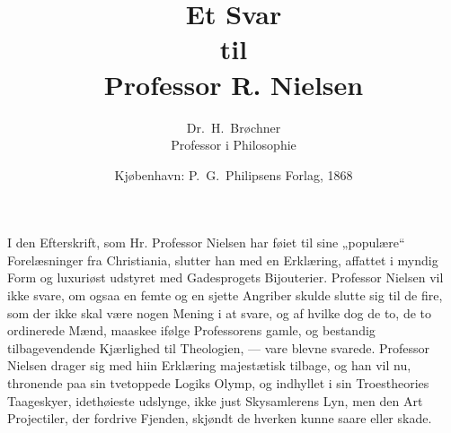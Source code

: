 \documentclass[12pt,a4paper]{book}
\title{\textbf{Et Svar\\[2pt] til\\[2pt] Professor R. Nielsen}}
\author{Dr.\ H.\ Brøchner\\[4pt]
  \small Professor i Philosophie}
\date{Kjøbenhavn: P.\ G.\ Philipsens Forlag, 1868}
\newcommand{\opage}[1]{\marginnote{\footnotesize\textit{[#1]}}}
\begin{document}
\maketitle
\thispagestyle{empty}
\newpage


\opage{3} %
\setcounter{footnote}{0}
I den Efterskrift, som Hr. Professor Nielsen har føiet til sine „populære“
Forelæsninger fra Christiania, slutter han med en Erklæring, affattet i myndig
Form og luxuriøst udstyret med Gadesprogets Bijouterier. Professor Nielsen vil
ikke svare, om ogsaa en femte og en sjette Angriber skulde slutte sig til de
fire, som der ikke skal være nogen Mening i at svare, og af hvilke dog de to, de
to ordinerede Mænd, maaskee ifølge Professorens gamle, og bestandig
tilbagevendende Kjærlighed til Theologien, --- vare blevne svarede.
Professor Nielsen drager sig med hiin Erklæring majestætisk tilbage, og han vil
nu, thronende paa sin tvetoppede Logiks Olymp, og indhyllet i sin Troestheories
Taageskyer, idethøieste udslynge, ikke just Skysamlerens Lyn, men den Art
Projectiler, der fordrive Fjenden, skjøndt de hverken kunne saare eller skade.
\end{document}
